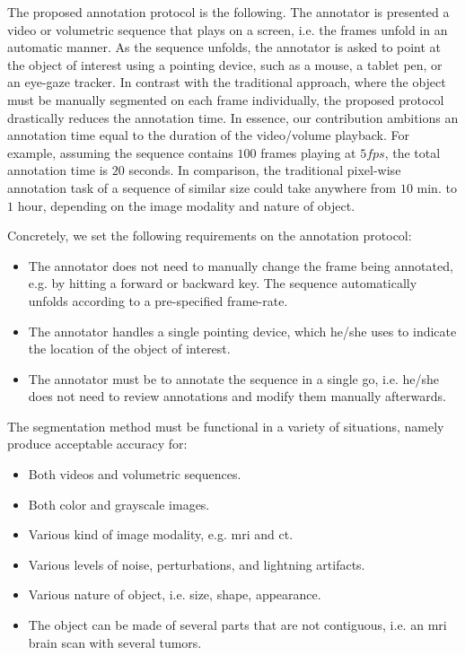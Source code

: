 The proposed annotation protocol is the following.
The annotator is presented a video or volumetric sequence that plays on a screen, i.e. the frames unfold in an automatic manner.
As the sequence unfolds, the annotator is asked to point at the object of interest using a pointing device, such as a mouse, a tablet pen, or an eye-gaze tracker.
In contrast with the traditional approach, where the object must be manually segmented on each frame individually, the proposed protocol drastically reduces the annotation time.
In essence, our contribution ambitions an annotation time equal to the duration of the video/volume playback.
For example, assuming the sequence contains $100$ frames playing at $5fps$, the total annotation time is $20$ seconds.
In comparison, the traditional pixel-wise annotation task of a sequence of similar size could take anywhere from $10$ min. to $1$ hour, depending on the image modality and nature of object.

Concretely, we set the following requirements on the annotation protocol:
\begin{itemize}
  \item The annotator does not need to manually change the frame being annotated, e.g. by hitting a forward or backward key. The sequence automatically unfolds according to a pre-specified frame-rate.
  \item The annotator handles a single pointing device, which he/she uses to indicate the location of the object of interest.
  \item The annotator must be to annotate the sequence in a single go, i.e. he/she does not need to review annotations and modify them manually afterwards.
\end{itemize}

The segmentation method must be functional in a variety of situations, namely produce acceptable accuracy for:
\begin{itemize}
  \item Both videos and volumetric sequences.
  \item Both color and grayscale images.
  \item Various kind of image modality, e.g. \gls{mri} and \gls{ct}.
  \item Various levels of noise, perturbations, and lightning artifacts.
  \item Various nature of object, i.e. size, shape, appearance.
  \item The object can be made of several parts that are not contiguous, i.e. an \gls{mri} brain scan with several tumors.
\end{itemize}


